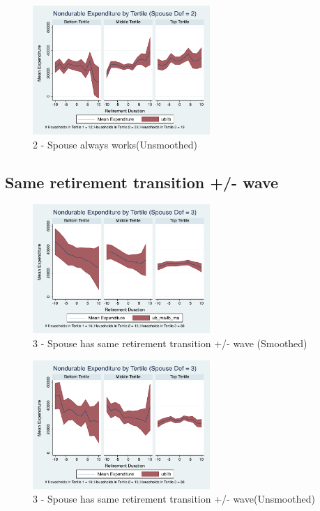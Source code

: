 \documentclass[11pt]{article}
\begin{document}
\begin{figure}[h]
	\caption{2 - Spouse always works(Unsmoothed)}
	\centering
	\includegraphics[width=0.6\textwidth]{../ConsumptionPostRetirement_by_SpouseDef/UNSmoothed/spouse_def_2.pdf}
\end{figure}
\clearpage

\subsection{Same retirement transition +/- wave}
\begin{figure}[h]
	\caption{3 - Spouse has same retirement transition +/- wave (Smoothed)}
	\centering
	\includegraphics[width=0.6\textwidth]{../ConsumptionPostRetirement_by_SpouseDef/Smoothed/spouse_def_3.pdf}
\end{figure}

\begin{figure}[h]
	\caption{3 - Spouse has same retirement transition +/- wave(Unsmoothed)}
	\centering
	\includegraphics[width=0.6\textwidth]{../ConsumptionPostRetirement_by_SpouseDef/UnSmoothed/spouse_def_3.pdf}
\end{figure}
\clearpage
\end{document}

